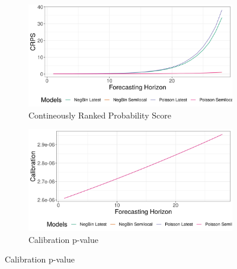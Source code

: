 \begin{figure}[H]
\begin{subfigure}{0.5\textwidth}
  \centering
  \includegraphics[width=\linewidth]{../output/Mangurujipa_crps.png}  
  \caption{Contineously Ranked Probability Score}
  \label{fig:sub-first}
\end{subfigure}
\begin{subfigure}{0.5\textwidth}
  \centering
  \includegraphics[width=\linewidth]{../output/Mangurujipa_calibration.png}  
  \caption{Calibration p-value}
  \label{fig:sub-second}
\end{subfigure}


\end{figure}
